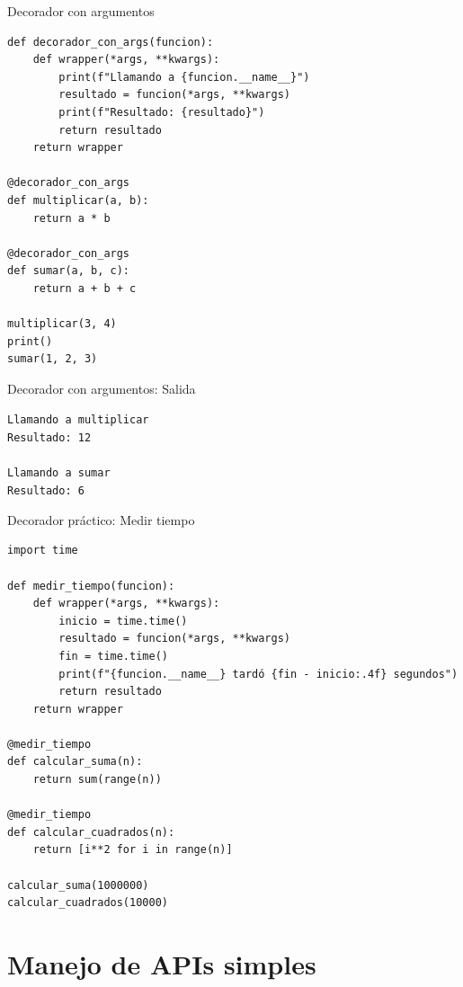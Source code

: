 \documentclass{beamer}
\begin{document}
\begin{frame}[fragile]{Decorador con argumentos \faWrench}
\begin{lstlisting}
def decorador_con_args(funcion):
    def wrapper(*args, **kwargs):
        print(f"Llamando a {funcion.__name__}")
        resultado = funcion(*args, **kwargs)
        print(f"Resultado: {resultado}")
        return resultado
    return wrapper

@decorador_con_args
def multiplicar(a, b):
    return a * b

@decorador_con_args
def sumar(a, b, c):
    return a + b + c

multiplicar(3, 4)
print()
sumar(1, 2, 3)
\end{lstlisting}
\end{frame}

\begin{frame}[fragile]{Decorador con argumentos: Salida \faArrowCircleRight}
\begin{tcolorbox}[colback=green!10,colframe=green,title={\small\faArrowCircleRight \ Salida},coltitle=fg0,left=3pt,right=3pt,top=3pt,bottom=3pt,boxsep=2pt]
\small\texttt{Llamando a multiplicar\\
Resultado: 12\\
\ \\
Llamando a sumar\\
Resultado: 6}
\end{tcolorbox}
\end{frame}

\begin{frame}[fragile]{Decorador práctico: Medir tiempo \faStopwatch}
\begin{lstlisting}
import time

def medir_tiempo(funcion):
    def wrapper(*args, **kwargs):
        inicio = time.time()
        resultado = funcion(*args, **kwargs)
        fin = time.time()
        print(f"{funcion.__name__} tardó {fin - inicio:.4f} segundos")
        return resultado
    return wrapper

@medir_tiempo
def calcular_suma(n):
    return sum(range(n))

@medir_tiempo
def calcular_cuadrados(n):
    return [i**2 for i in range(n)]

calcular_suma(1000000)
calcular_cuadrados(10000)
\end{lstlisting}
\end{frame}

\section{Manejo de APIs simples}
\end{document}
